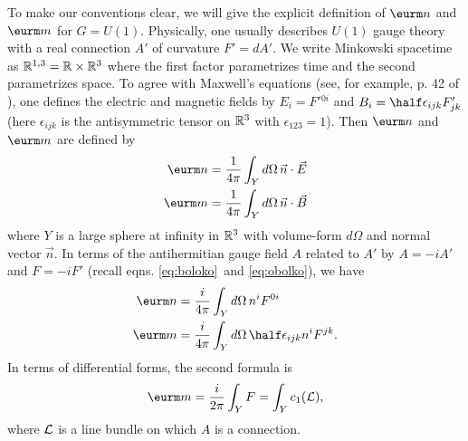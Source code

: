 To make our conventions clear, we will give the explicit
definition of $\eurm n$ and $\eurm m$ for $G=U(1)$.  Physically,
one usually describes $U(1)$ gauge theory with a real connection
$A'$ of curvature $F'=dA'$.  We write Minkowski spacetime as
$\Bbb{R}^{1,3}=\Bbb{R}\times \Bbb{R}^3$ where the first factor
parametrizes time and the second parametrizes space.  To agree
with Maxwell's equations (see, for example, p. 42 of
\cite{ref51}), one defines the electric and magnetic fields by
$E_i=F'{}^{0i}$ and $B_i=\half\epsilon_{ijk}F'_{jk}$ (here
$\epsilon_{ijk}$ is the antisymmetric tensor on $\Bbb{R}^3$ with
$\epsilon_{123}=1$). Then $\eurm n$ and $\eurm m$ are defined by
\setcounter{equation}{18}
\begin{equation}\label{eq:eltro}
\begin{aligned}{\eurm n} & = {1\over 4\pi}\int_Y d\Omega\,
\vec n\cdot \vec E\\ {\eurm m}&={1\over 4\pi}\int_Yd\Omega\,\vec
n\cdot \vec B\\\end{aligned}
\end{equation}
 where $Y$ is a large sphere at infinity in
$\Bbb{R}^3$ with volume-form $d\Omega$ and normal vector $\vec n$.
In terms of the antihermitian gauge field $A$ related to $A'$ by
$A=-iA'$ and $F=-iF'$ (recall eqns. \eqref{eq:boloko}\ and \eqref{eq:obolko}), we have
\setcounter{equation}{19}
\begin{equation}\label{eq:feltro}
\begin{aligned}{\eurm n} & = {i\over 4\pi}\int_Y d\Omega\,
n^i F^{0i}\\ {\eurm m}&={i\over 4\pi}\int_Yd\Omega\,\half
\epsilon_{ijk}n^i F^{jk}.\\\end{aligned}
\end{equation}
 In terms of differential forms, the
second formula is %
\setcounter{equation}{20}
\begin{equation}\label{eq:ofeltro}
{\eurm m}={i\over 2\pi}\int_YF
=\int_Y c_1({\cal L}),
\end{equation}
 where ${\cal L}$ is a line bundle on which
$A$ is a connection.


